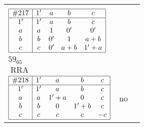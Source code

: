 \documentclass[12pt]{article}
\newcommand\RRA{\operatorname{RRA}}
\newcommand{\join}{\mathbin{+}}%
\newcommand{\id}{{1'}}%
\renewcommand{\div}{0'}
\renewcommand{\top}{1}%
\begin{document}
\begin{center}
\begin{longtable}{l|c|c}
{\begin{tikzpicture}[<->,shorten <=1pt,shorten >=1pt,label distance=0mm, font=\small]
\end{tikzpicture}
}      \\[15mm]

$
\begin{array}{|c|cccc|} \hline
\#217 & \id & a & b & c \\ \hline
\id & \id & a & b & c \\
a & a & \top & \div & \div \\
b & b & \div & \top & a \join b \\
c & c & \div & a \join b & \id \join a \\ \hline
\end{array}
$
 & \begin{tabular}{c} yes \\ $59_{65}$ \\ $\RRA$ \end{tabular} 
 & \adjustbox{valign=c, max height=1.6cm}{$
\left[ \begin{array}{cccccc}
\id & a & a & b & c & a \\ 
a & \id & a & a & a & c \\ 
a & a & \id & b & b & b \\ 
b & a & b & \id & b & b \\ 
c & a & b & b & \id & c \\ 
a & c & b & b & c & \id
\end{array}\right]
$}     \\[15mm]

$
\begin{array}{|c|cccc|} \hline
\#218 & \id & a & b & c \\ \hline
\id & \id & a & b & c \\
a & a & \id \join a & 0 & c \\
b & b & 0 & \id \join b & c \\
c & c & c & c & -c \\ \hline
\end{array}
$
 & no  
 & \adjustbox{valign=c, max height=1.6cm}{$
\left[ \begin{array}{cccccc}
\id & a & a & c & c & c \\ 
a & \id & a & c & c & c \\ 
a & a & \id & c & c & c \\ 
c & c & c & \id & b & b \\ 
c & c & c & b & \id & b \\ 
c & c & c & b & b & \id
\end{array}\right]
$}     \\[15mm]


\end{longtable}
\end{center}
\end{document}

